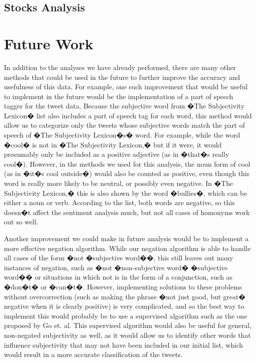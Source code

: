 \documentclass[11pt]{article}
\begin{document}
\subsection{Stocks Analysis}


\section{Future Work}
In addition to the analyses we have already performed, there are many other methods that could be used in the future to further improve the accuracy and usefulness of this data.  For example, one such improvement that would be useful to implement in the future would be the implementation of a part of speech tagger for the tweet data.  Because the subjective word from �The Subjectivity Lexicon� list also includes a part of speech tag for each word, this method would allow us to categorize only the tweets whose subjective words match the part of speech of �The Subjectivity Lexicon�s� word.  For example, while the word �cool� is not in �The Subjectivity Lexicon,� but if it were, it would presumably only be included as a positive adjective (as in �that�s really cool�).  However, in the methods we used for this analysis, the noun form of cool (as in �it�s cool outside�) would also be counted as positive, even though this word is really more likely to be neutral, or possibly even negative.  In �The Subjectivity Lexicon,� this is also shown by the word �bullies�, which can be either a noun or verb.  According to the list, both words are negative, so this doesn�t affect the sentiment analysis much, but not all cases of homonyms work out so well.

Another improvement we could make in future analysis would be to implement a more effective negation algorithm.  While our negation algorithm is able to handle all cases of the form �not �subjective word��, this still leaves out many instances of negation, such as �not �non-subjective word� �subjective word�� or situations in which not is in the form of a conjunction, such as �don�t� or �can�t�.  However, implementing solutions to these problems without overcorrection (such as making the phrase �not just good, but great� negative when it is clearly positive) is very complicated, and so the best way to implement this would probably be to use a supervised algorithm such as the one proposed by Go et. al.   This supervised algorithm would also be useful for general, non-negated subjectivity as well, as it would allow us to identify other words that influence subjectivity that may not have been included in our initial list, which would result in a more accurate classification of the tweets.
\end{document}
